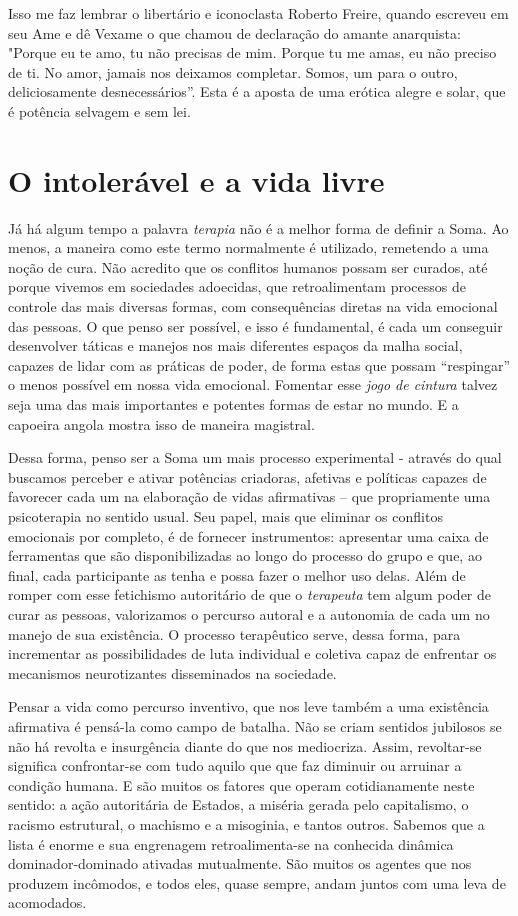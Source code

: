 Isso me faz lembrar o libertário e iconoclasta Roberto Freire, quando
escreveu em seu Ame e dê Vexame o que chamou de declaração do amante
anarquista: "Porque eu te amo, tu não precisas de mim. Porque tu me
amas, eu não preciso de ti. No amor, jamais nos deixamos completar.
Somos, um para o outro, deliciosamente desnecessários''. Esta é a aposta
de uma erótica alegre e solar, que é potência selvagem e sem lei.

\section{O intolerável e a vida livre}

Já há algum tempo a palavra \emph{terapia} não é a melhor forma de
definir a Soma. Ao menos, a maneira como este termo normalmente é
utilizado, remetendo a uma noção de cura. Não acredito que os conflitos
humanos possam ser curados, até porque vivemos em sociedades adoecidas,
que retroalimentam processos de controle das mais diversas formas, com
consequências diretas na vida emocional das pessoas. O que penso ser
possível, e isso é fundamental, é cada um conseguir desenvolver táticas
e manejos nos mais diferentes espaços da malha social, capazes de lidar
com as práticas de poder, de forma estas que possam ``respingar'' o
menos possível em nossa vida emocional. Fomentar esse \emph{jogo de
cintura} talvez seja uma das mais importantes e potentes formas de estar
no mundo. E a capoeira angola mostra isso de maneira magistral.

Dessa forma, penso ser a Soma um mais processo experimental - através do
qual buscamos perceber e ativar potências criadoras, afetivas e
políticas capazes de favorecer cada um na elaboração de vidas
afirmativas -- que propriamente uma psicoterapia no sentido usual. Seu
papel, mais que eliminar os conflitos emocionais por completo, é de
fornecer instrumentos: apresentar uma caixa de ferramentas que são
disponibilizadas ao longo do processo do grupo e que, ao final, cada
participante as tenha e possa fazer o melhor uso delas. Além de romper
com esse fetichismo autoritário de que o \emph{terapeuta} tem algum
poder de curar as pessoas, valorizamos o percurso autoral e a autonomia
de cada um no manejo de sua existência. O processo terapêutico serve,
dessa forma, para incrementar as possibilidades de luta individual e
coletiva capaz de enfrentar os mecanismos neurotizantes disseminados na
sociedade.

Pensar a vida como percurso inventivo, que nos leve também a uma
existência afirmativa é pensá-la como campo de batalha. Não se criam
sentidos jubilosos se não há revolta e insurgência diante do que nos
mediocriza. Assim, revoltar-se significa confrontar-se com tudo aquilo
que que faz diminuir ou arruinar a condição humana. E são muitos os
fatores que operam cotidianamente neste sentido: a ação autoritária de
Estados, a miséria gerada pelo capitalismo, o racismo estrutural, o
machismo e a misoginia, e tantos outros. Sabemos que a lista é enorme e
sua engrenagem retroalimenta-se na conhecida dinâmica dominador-dominado
ativadas mutualmente. São muitos os agentes que nos produzem incômodos,
e todos eles, quase sempre, andam juntos com uma leva de acomodados.

